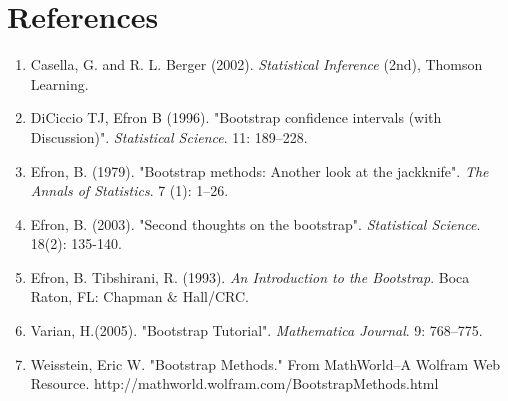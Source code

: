 \documentclass{journal}
\begin{document}
\section*{References}
\begin{enumerate}
\item Casella, G. and R. L. Berger (2002). \textit{Statistical Inference} (2nd), Thomson Learning.
\item DiCiccio TJ, Efron B (1996). "Bootstrap confidence intervals (with Discussion)". \textit{Statistical Science}. 11: 189–228.
\item Efron, B. (1979). "Bootstrap methods: Another look at the jackknife". \textit{The Annals of Statistics}. 7 (1): 1–26.
\item Efron, B. (2003). "Second thoughts on the bootstrap". \textit{Statistical Science}. 18(2): 135-140.
\item Efron, B. Tibshirani, R. (1993). \textit{An Introduction to the Bootstrap}. Boca Raton, FL: Chapman \& Hall/CRC. 
\item Varian, H.(2005). "Bootstrap Tutorial". \textit{Mathematica Journal}. 9: 768–775.
\item Weisstein, Eric W. "Bootstrap Methods." From MathWorld--A Wolfram Web Resource. http://mathworld.wolfram.com/BootstrapMethods.html
\end{enumerate}
\end{document}
